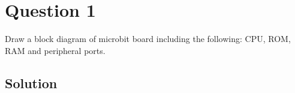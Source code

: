 \section*{Question 1}

Draw a block diagram of microbit board including the following: CPU, ROM, RAM and peripheral ports.

\subsection*{Solution}
